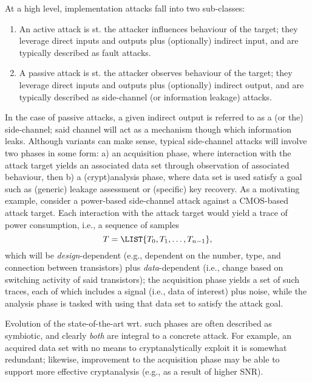 At a high level, implementation attacks fall into two sub-classes:

\begin{enumerate}
\item An active  attack
      is st. the attacker influences behaviour of the target;
      they leverage direct inputs and outputs plus (optionally) indirect  input,
      and are typically described as 
      fault
      attacks.
\item A  passive attack
      is st. the attacker   observes behaviour of the target;
      they leverage direct inputs and outputs plus (optionally) indirect output,
      and are typically described as 
      side-channel (or information leakage)
      attacks.
\end{enumerate}

\noindent
In the case of passive attacks, a given indirect output is referred to as
a (or the) side-channel; said channel will act as a mechanism though which
information leaks.  Although variants can make sense, typical side-channel
attacks will involve two phases in some form:
a) an acquisition    phase, 
   where interaction with the attack target yields an associated data set
   through observation of associated behaviour,
   then
b) a (crypt)analysis phase,
   where data set is used satisfy a goal such as 
    (generic) leakage assessment
   or 
   (specific) key recovery.
As a motivating example, consider a power-based side-channel attack against
a CMOS-based attack target.  Each interaction with the attack target would
yield a trace of power consumption, i.e., a sequence of samples
\[
T = \LIST{ T_0, T_1, \ldots, T_{n-1} } ,
\]
which will be
{\em design}-dependent
(e.g., dependent on the number, type, and connection between transistors)
plus
{\em  data}-dependent
(i.e., change based on switching activity of said transistors);
the acquisition phase yields a set of such traces, each of which includes
a signal (i.e., data of interest) plus noise, while the analysis phase is
tasked with using that data set to satisfy the attack goal.

Evolution of the state-of-the-art wrt. such phases are often described as
symbiotic, and clearly {\em both} are integral to a concrete attack.  For
example, an acquired data set with no means to cryptanalytically exploit
it is somewhat redundant; likewise, improvement to the acquisition phase
may be able to support more effective cryptanalysis (e.g., as a result of
higher SNR).


